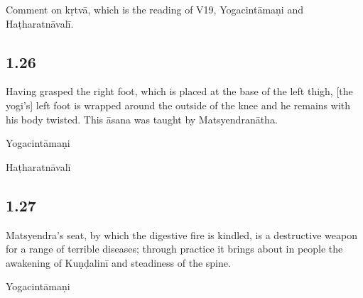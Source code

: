 \begin{ekdosis}
\begin{testimonia}[hp01_025]
\end{testimonia}

\begin{philcomm}[hp01_025]
Comment on kṛtvā, which is the reading of V19, Yogacintāmaṇi and Haṭharatnāvalī.
\end{philcomm}

\subsection*{1.26}
\begin{translation}[hp01_026]
Having grasped the right foot, which is placed at the base of the left thigh, [the yogi’s] left foot is wrapped around the outside of the knee and he remains with his body twisted. This āsana was taught by Matsyendranātha.
\end{translation}

\begin{testimonia}[hp01_026]
Yogacintāmaṇi

\begin{versinnote}
\end{versinnote}

Haṭharatnāvalī

\begin{versinnote}
\end{versinnote}

\end{testimonia}

\subsection*{1.27}
\begin{translation}[hp01_027]
Matsyendra's seat, by which the digestive fire is kindled, is a destructive weapon for a range of terrible diseases; through practice it brings about in people the awakening of Kuṇḍalinī and steadiness of the spine.
\end{translation}

\begin{testimonia}[hp01_027]
Yogacintāmaṇi


\end{testimonia}
\end{ekdosis}
